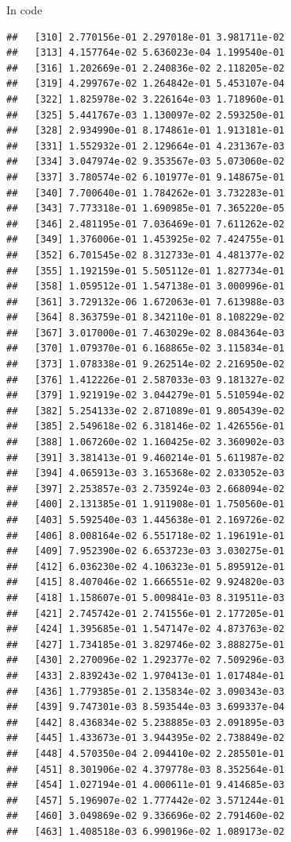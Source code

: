 \documentclass[ignorenonframetext,]{beamer}
\begin{document}
\begin{frame}[fragile]{In code}
\begin{verbatim}
##   [310] 2.770156e-01 2.297018e-01 3.981711e-02
##   [313] 4.157764e-02 5.636023e-04 1.199540e-01
##   [316] 1.202669e-01 2.240836e-02 2.118205e-02
##   [319] 4.299767e-02 1.264842e-01 5.453107e-04
##   [322] 1.825978e-02 3.226164e-03 1.718960e-01
##   [325] 5.441767e-03 1.130097e-02 2.593250e-01
##   [328] 2.934990e-01 8.174861e-01 1.913181e-01
##   [331] 1.552932e-01 2.129664e-01 4.231367e-03
##   [334] 3.047974e-02 9.353567e-03 5.073060e-02
##   [337] 3.780574e-02 6.101977e-01 9.148675e-01
##   [340] 7.700640e-01 1.784262e-01 3.732283e-01
##   [343] 7.773318e-01 1.690985e-01 7.365220e-05
##   [346] 2.481195e-01 7.036469e-01 7.611262e-02
##   [349] 1.376006e-01 1.453925e-02 7.424755e-01
##   [352] 6.701545e-02 8.312733e-01 4.481377e-02
##   [355] 1.192159e-01 5.505112e-01 1.827734e-01
##   [358] 1.059512e-01 1.547138e-01 3.000996e-01
##   [361] 3.729132e-06 1.672063e-01 7.613988e-03
##   [364] 8.363759e-01 8.342110e-01 8.108229e-02
##   [367] 3.017000e-01 7.463029e-02 8.084364e-03
##   [370] 1.079370e-01 6.168865e-02 3.115834e-01
##   [373] 1.078338e-01 9.262514e-02 2.216950e-02
##   [376] 1.412226e-01 2.587033e-03 9.181327e-02
##   [379] 1.921919e-02 3.044279e-01 5.510594e-02
##   [382] 5.254133e-02 2.871089e-01 9.805439e-02
##   [385] 2.549618e-02 6.318146e-02 1.426556e-01
##   [388] 1.067260e-02 1.160425e-02 3.360902e-03
##   [391] 3.381413e-01 9.460214e-01 5.611987e-02
##   [394] 4.065913e-03 3.165368e-02 2.033052e-03
##   [397] 2.253857e-03 2.735924e-03 2.668094e-02
##   [400] 2.131385e-01 1.911908e-01 1.750560e-01
##   [403] 5.592540e-03 1.445638e-01 2.169726e-02
##   [406] 8.008164e-02 6.551718e-02 1.196191e-01
##   [409] 7.952390e-02 6.653723e-03 3.030275e-01
##   [412] 6.036230e-02 4.106323e-01 5.895912e-01
##   [415] 8.407046e-02 1.666551e-02 9.924820e-03
##   [418] 1.158607e-01 5.009841e-03 8.319511e-03
##   [421] 2.745742e-01 2.741556e-01 2.177205e-01
##   [424] 1.395685e-01 1.547147e-02 4.873763e-02
##   [427] 1.734185e-01 3.829746e-02 3.888275e-01
##   [430] 2.270096e-02 1.292377e-02 7.509296e-03
##   [433] 2.839243e-02 1.970413e-01 1.017484e-01
##   [436] 1.779385e-01 2.135834e-02 3.090343e-03
##   [439] 9.747301e-03 8.593544e-03 3.699337e-04
##   [442] 8.436834e-02 5.238885e-03 2.091895e-03
##   [445] 1.433673e-01 3.944395e-02 2.738849e-02
##   [448] 4.570350e-04 2.094410e-02 2.285501e-01
##   [451] 8.301906e-02 4.379778e-03 8.352564e-01
##   [454] 1.027194e-01 4.000611e-01 9.414685e-03
##   [457] 5.196907e-02 1.777442e-02 3.571244e-01
##   [460] 3.049869e-02 9.336696e-02 2.791460e-02
##   [463] 1.408518e-03 6.990196e-02 1.089173e-02

\end{verbatim}
\end{frame}
\end{document}
